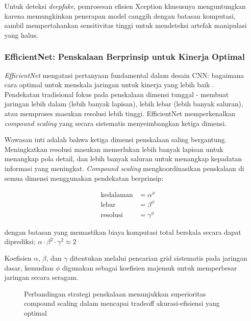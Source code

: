 Untuk deteksi \textit{deepfake}, pemrosesan efisien Xception khususnya menguntungkan karena memungkinkan penerapan model canggih dengan batasan komputasi, sambil mempertahankan sensitivitas tinggi untuk mendeteksi artefak manipulasi yang halus.

\subsubsection{EfficientNet: Penskalaan Berprinsip untuk Kinerja Optimal}

\textit{EfficientNet} mengatasi pertanyaan fundamental dalam desain CNN: bagaimana cara optimal untuk menskala jaringan untuk kinerja yang lebih baik \cite{tan2019efficientnet}. Pendekatan tradisional fokus pada penskalaan dimensi tunggal - membuat jaringan lebih dalam (lebih banyak lapisan), lebih lebar (lebih banyak saluran), atau memproses masukan resolusi lebih tinggi. EfficientNet memperkenalkan \textit{compound scaling} yang secara sistematis menyeimbangkan ketiga dimensi.

Wawasan inti adalah bahwa ketiga dimensi penskalaan saling bergantung. Meningkatkan resolusi masukan memerlukan lebih banyak lapisan untuk menangkap pola detail, dan lebih banyak saluran untuk menangkap kepadatan informasi yang meningkat. \textit{Compound scaling} mengkoordinasikan penskalaan di semua dimensi menggunakan pendekatan berprinsip:

\begin{align}
\text{kedalaman} &= \alpha^\phi \label{eq:depth_scaling} \\
\text{lebar} &= \beta^\phi \label{eq:width_scaling} \\
\text{resolusi} &= \gamma^\phi \label{eq:resolution_scaling}
\end{align}

dengan batasan yang memastikan biaya komputasi total berskala secara dapat diprediksi: $\alpha \cdot \beta^2 \cdot \gamma^2 \approx 2$

Koefisien $\alpha$, $\beta$, dan $\gamma$ ditentukan melalui pencarian grid sistematis pada jaringan dasar, kemudian $\phi$ digunakan sebagai koefisien majemuk untuk memperbesar jaringan secara seragam.

\begin{figure}[H]
    \centering
    \caption{Perbandingan strategi penskalaan menunjukkan superioritas compound scaling dalam mencapai tradeoff akurasi-efisiensi yang optimal}
    \label{fig:efficientnet_scaling}
\end{figure}

